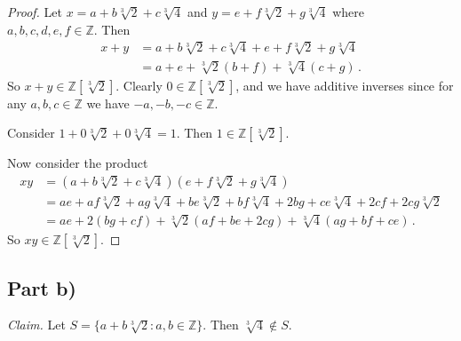 \documentclass{abrice}
\newcommand{\Z}{\mathbb{Z}}
\begin{document}
\begin{proof}
  Let $x = a + b \sqrt[3]{2} + c \sqrt[3]{4}$ and $y = e + f \sqrt[3]{2} + g
  \sqrt[3]{4}$ where $a,b,c,d,e,f \in \Z$. Then
  \begin{align*}
    x + y
    &= a + b \sqrt[3]{2} + c \sqrt[3]{4} + e + f \sqrt[3]{2} + g \sqrt[3]{4} \\
    &= a + e + \sqrt[3]{2}(b + f) + \sqrt[3]{4}(c + g)\, .
  \end{align*}
  So $x + y \in \Z[\sqrt[3]{2}]$. Clearly $0 \in \Z[\sqrt[3]{2}]$, and we have
  additive inverses since for any $a,b,c \in \Z$ we have $-a,-b,-c \in \Z$.

  Consider $1 + 0\sqrt[3]{2} + 0\sqrt[3]{4} = 1$. Then $1 \in \Z[\sqrt[3]{2}]$.

  Now consider the product
  \begin{align*}
    xy
    &= (a + b \sqrt[3]{2} + c \sqrt[3]{4})(e + f \sqrt[3]{2} + g \sqrt[3]{4}) \\
    &= ae + af \sqrt[3]{2} + ag \sqrt[3]{4} + be \sqrt[3]{2} + bf \sqrt[3]{4}
      + 2bg + ce \sqrt[3]{4} + 2cf + 2cg \sqrt[3]{2} \\
    &= ae + 2(bg + cf) + \sqrt[3]{2} (af + be + 2cg) + \sqrt[3]{4} (ag + bf + ce)\, .
  \end{align*}
  So $xy \in \Z[\sqrt[3]{2}]$.
\end{proof}

\subsection{Part b)}

\emph{Claim.} Let $S = \{ a + b \sqrt[3]{2} : a,b \in \Z \}$. Then $\sqrt[3]{4}
\notin S$.
\end{document}
